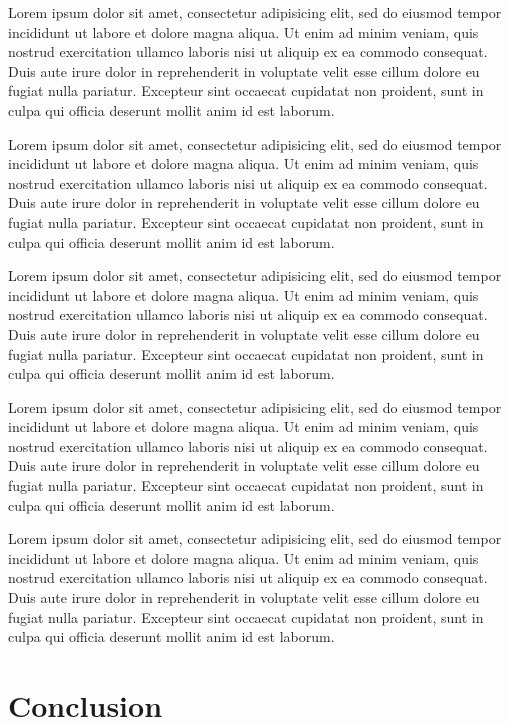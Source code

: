 \documentclass[annual]{acmsiggraph}
\begin{document}
Lorem ipsum dolor sit amet, consectetur adipisicing elit, sed do
eiusmod tempor incididunt ut labore et dolore magna aliqua. Ut enim ad
minim veniam, quis nostrud exercitation ullamco laboris nisi ut
aliquip ex ea commodo consequat. Duis aute irure dolor in
reprehenderit in voluptate velit esse cillum dolore eu fugiat nulla
pariatur. Excepteur sint occaecat cupidatat non proident, sunt in
culpa qui officia deserunt mollit anim id est laborum.

Lorem ipsum dolor sit amet, consectetur adipisicing elit, sed do
eiusmod tempor incididunt ut labore et dolore magna aliqua. Ut enim ad
minim veniam, quis nostrud exercitation ullamco laboris nisi ut
aliquip ex ea commodo consequat. Duis aute irure dolor in
reprehenderit in voluptate velit esse cillum dolore eu fugiat nulla
pariatur. Excepteur sint occaecat cupidatat non proident, sunt in
culpa qui officia deserunt mollit anim id est laborum.

Lorem ipsum dolor sit amet, consectetur adipisicing elit, sed do
eiusmod tempor incididunt ut labore et dolore magna aliqua. Ut enim ad
minim veniam, quis nostrud exercitation ullamco laboris nisi ut
aliquip ex ea commodo consequat. Duis aute irure dolor in
reprehenderit in voluptate velit esse cillum dolore eu fugiat nulla
pariatur. Excepteur sint occaecat cupidatat non proident, sunt in
culpa qui officia deserunt mollit anim id est laborum.

Lorem ipsum dolor sit amet, consectetur adipisicing elit, sed do
eiusmod tempor incididunt ut labore et dolore magna aliqua. Ut enim ad
minim veniam, quis nostrud exercitation ullamco laboris nisi ut
aliquip ex ea commodo consequat. Duis aute irure dolor in
reprehenderit in voluptate velit esse cillum dolore eu fugiat nulla
pariatur. Excepteur sint occaecat cupidatat non proident, sunt in
culpa qui officia deserunt mollit anim id est laborum.

Lorem ipsum dolor sit amet, consectetur adipisicing elit, sed do
eiusmod tempor incididunt ut labore et dolore magna aliqua. Ut enim ad
minim veniam, quis nostrud exercitation ullamco laboris nisi ut
aliquip ex ea commodo consequat. Duis aute irure dolor in
reprehenderit in voluptate velit esse cillum dolore eu fugiat nulla
pariatur. Excepteur sint occaecat cupidatat non proident, sunt in
culpa qui officia deserunt mollit anim id est laborum.

\section{Conclusion}
\end{document}
